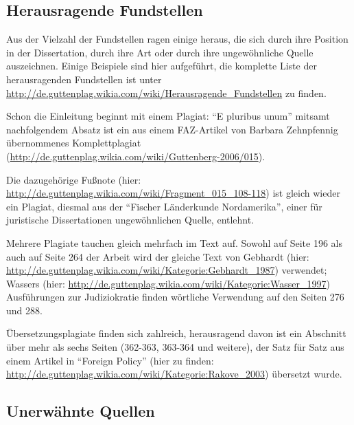 \documentclass[ngerman,final,fontsize=12pt,paper=a4,twoside,BCOR=8mm,draft=false]{scrartcl}
\begin{document}
\subsection{Herausragende Fundstellen}
Aus der Vielzahl der Fundstellen ragen einige heraus, die sich durch ihre Position in der Dissertation, durch ihre Art oder durch ihre ungewöhnliche Quelle auszeichnen. Einige Beispiele sind hier aufgeführt, die komplette Liste der herausragenden Fundstellen ist unter \url{http://de.guttenplag.wikia.com/wiki/Herausragende\_Fundstellen} zu finden. 

Schon die Einleitung beginnt mit einem Plagiat: "`E pluribus unum"' mitsamt nachfolgendem Absatz ist ein aus einem FAZ-Artikel von Barbara Zehnpfennig übernommenes Komplettplagiat (\url{http://de.guttenplag.wikia.com/wiki/Guttenberg-2006/015}). 

Die dazugehörige Fußnote (hier: \url{http://de.guttenplag.wikia.com/wiki/Fragment\_015\_108-118}) ist gleich wieder ein Plagiat, diesmal aus der "`Fischer Länderkunde Nordamerika"', einer für juristische Dissertationen ungewöhnlichen Quelle, entlehnt. 

Mehrere Plagiate tauchen gleich mehrfach im Text auf. Sowohl auf Seite
196 als auch auf Seite 264 der Arbeit wird der gleiche Text von
Gebhardt (hier:
\url{http://de.guttenplag.wikia.com/wiki/Kategorie:Gebhardt\_1987})
verwendet; Wassers (hier: \url{http://de.guttenplag.wikia.com/wiki/Kategorie:Wasser\_1997})
Ausführungen zur Judiziokratie finden wörtliche Verwendung auf den
Seiten 276 und 288.

Übersetzungsplagiate finden sich zahlreich, herausragend davon ist ein Abschnitt über mehr als sechs Seiten (362-363, 363-364 und weitere), der Satz für Satz aus einem Artikel in "`Foreign Policy"' (hier zu finden: \url{http://de.guttenplag.wikia.com/wiki/Kategorie:Rakove\_2003}) übersetzt wurde.

\subsection{Unerwähnte Quellen}
\end{document}
